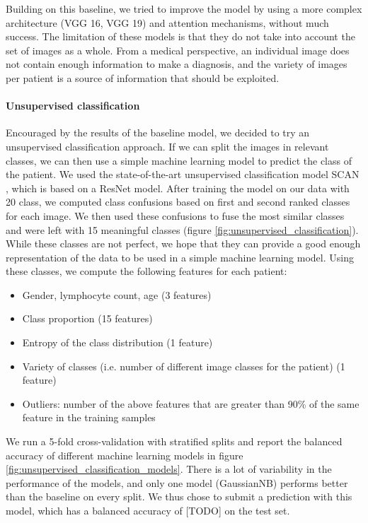 \documentclass{midl}
\begin{document}
Building on this baseline, we tried to improve the model by using a more complex architecture (VGG 16, VGG 19) and attention mechanisms, without much success. The limitation of these models is that they do not take into account the set of images as a whole. From a medical perspective, an individual image does not contain enough information to make a diagnosis, and the variety of images per patient is a source of information that should be exploited.

\paragraph*{Unsupervised classification}

Encouraged by the results of the baseline model, we decided to try an unsupervised classification approach. If we can split the images in relevant classes, we can then use a simple machine learning model to predict the class of the patient. We used the state-of-the-art unsupervised classification model SCAN \cite{van-gansbeke-2020}, which is based on a ResNet model. After training the model on our data with 20 class, we computed class confusions based on first and second ranked classes for each image. We then used these confusions to fuse the most similar classes and were left with 15 meaningful classes (figure \ref{fig:unsupervised_classification}). While these classes are not perfect, we hope that they can provide a good enough representation of the data to be used in a simple machine learning model. Using these classes, we compute the following features for each patient:

\begin{itemize}
    \setlength\itemsep{0em}
    \item Gender, lymphocyte count, age (3 features)
    \item Class proportion (15 features)
    \item Entropy of the class distribution (1 feature)
    \item Variety of classes (i.e. number of different image classes for the patient) (1 feature)
    \item Outliers: number of the above features that are greater than 90\% of the same feature in the training samples
\end{itemize}

We run a 5-fold cross-validation with stratified splits and report the balanced accuracy of different machine learning models in figure \ref{fig:unsupervised_classification_models}. There is a lot of variability in the performance of the models, and only one model (GaussianNB) performs better than the baseline on every split. We thus chose to submit a prediction with this model, which has a balanced accuracy of [TODO] on the test set.
\end{document}
